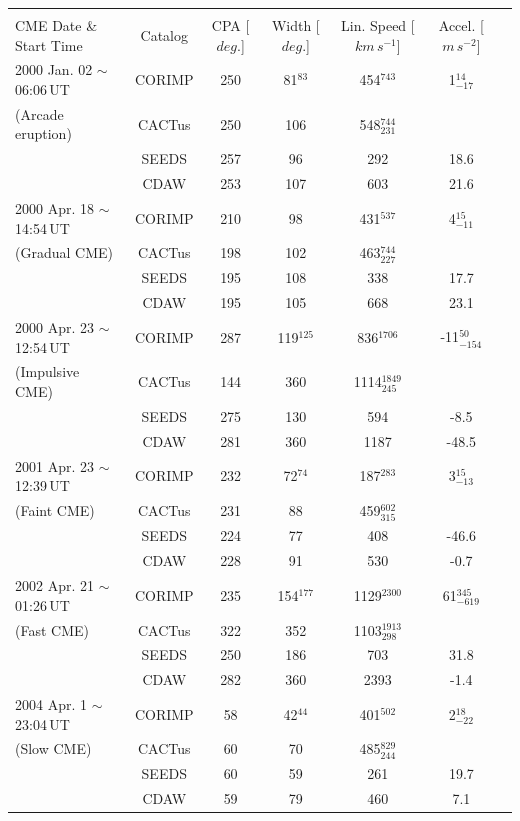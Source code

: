 \documentclass[referee,a4paper,12pt,traditabstract]{swsc}
\begin{document}
\begin{table}[!t]
\begin{tabular}{l*{5}{c}r}
\multicolumn{6}{c}{} \\
CME Date \& Start Time & Catalog              & CPA [$deg.$] & Width [$deg.$] & Lin. Speed [$km\,s^{-1}$] & Accel. [$m\,s^{-2}$]  \\
\hline
\hline
2000 Jan. 02 $\sim$06:06\,UT & CORIMP         & 250   & 81$^{83}$   & 454$^{743}$ &  1$_{-17}^{14}$  \\
(Arcade eruption) & CACTus          & 250 & 106 & 548$_{231}^{744}$ &     \\
& SEEDS        & 257 & 96 & 292 & 18.6  \\
& CDAW     & 253 & 107 & 603 & 21.6 \\
\hline
2000 Apr. 18 $\sim$14:54\,UT & CORIMP      & 210 & 98 & 431$^{537}$ & 4$_{-11}^{15}$   \\
(Gradual CME) & CACTus     & 198 & 102 & 463$_{227}^{744}$ &     \\
& SEEDS        & 195 & 108 & 338 & 17.7    \\
& CDAW         & 195 & 105 & 668 & 23.1    \\
\hline
2000 Apr. 23 $\sim$12:54\,UT & CORIMP   & 287 & 119$^{125}$ & 836$^{1706}$ & -11$_{-154}^{50}$       \\
(Impulsive CME) & CACTus  & 144 & 360 & 1114$_{245}^{1849}$ &            \\
& SEEDS  & 275 & 130 & 594 & -8.5        \\
& CDAW      & 281 & 360 & 1187 & -48.5 \\
\hline
2001 Apr. 23 $\sim$12:39\,UT & CORIMP   & 232 & 72$^{74}$ & 187$^{283}$ & 3$_{-13}^{15}$ \\
(Faint CME) & CACTus  & 231 & 88 & 459$_{315}^{602}$ &  \\
& SEEDS    & 224 & 77 & 408 & -46.6  \\
& CDAW      & 228 & 91 & 530 & -0.7 \\
\hline
2002 Apr. 21 $\sim$01:26\,UT & CORIMP   & 235 & 154$^{177}$ & 1129$^{2300}$ & 61$_{-619}^{345}$ \\
(Fast CME) & CACTus   & 322 & 352 & 1103$_{298}^{1913}$ &  \\
& SEEDS    & 250 & 186 & 703 & 31.8 \\
& CDAW      & 282 & 360 & 2393 & -1.4 \\
\hline
2004 Apr. 1 $\sim$23:04\,UT & CORIMP   & 58 & 42$^{44}$ & 401$^{502}$ & 2$_{-22}^{18}$ \\
(Slow CME) & CACTus  & 60 & 70 & 485$_{244}^{829}$ & \\
& SEEDS     & 60 & 59 & 261 & 19.7 \\
& CDAW      & 59 & 79 & 460 & 7.1 \\


\end{tabular}
\end{table}
\end{document}
